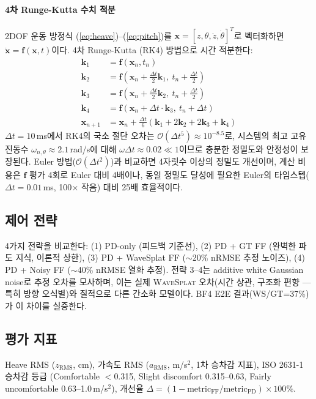 \documentclass[11pt]{report}
\numberwithin{equation}{chapter}
\numberwithin{figure}{chapter}
\numberwithin{table}{chapter}
\newcommand{\WS}{\textsc{WaveSplat}}
\begin{document}
\paragraph{4차 Runge-Kutta 수치 적분}
2DOF 운동 방정식 (\ref{eq:heave})--(\ref{eq:pitch})를
$\mathbf{x} = [z, \theta, \dot{z}, \dot{\theta}]^T$로 벡터화하면
$\dot{\mathbf{x}} = \mathbf{f}(\mathbf{x}, t)$이다.
4차 Runge-Kutta (RK4) 방법으로 시간 적분한다:
\begin{align}
  \mathbf{k}_1 &= \mathbf{f}(\mathbf{x}_n, t_n) \\
  \mathbf{k}_2 &= \mathbf{f}(\mathbf{x}_n + \tfrac{\Delta t}{2}\mathbf{k}_1,\ t_n + \tfrac{\Delta t}{2}) \\
  \mathbf{k}_3 &= \mathbf{f}(\mathbf{x}_n + \tfrac{\Delta t}{2}\mathbf{k}_2,\ t_n + \tfrac{\Delta t}{2}) \\
  \mathbf{k}_4 &= \mathbf{f}(\mathbf{x}_n + \Delta t \cdot \mathbf{k}_3,\ t_n + \Delta t) \\
  \mathbf{x}_{n+1} &= \mathbf{x}_n + \frac{\Delta t}{6}(\mathbf{k}_1 + 2\mathbf{k}_2 + 2\mathbf{k}_3 + \mathbf{k}_4)
\end{align}
$\Delta t = 10$\,ms에서 RK4의 국소 절단 오차는 $\mathcal{O}(\Delta t^5) \approx 10^{-8.5}$로,
시스템의 최고 고유진동수 $\omega_{n,\theta} \approx 2.1$\,rad/s에 대해
$\omega \Delta t \approx 0.02 \ll 1$이므로 충분한 정밀도와 안정성이 보장된다.
Euler 방법($\mathcal{O}(\Delta t^2)$)과 비교하면 4자릿수 이상의 정밀도 개선이며,
계산 비용은 $\mathbf{f}$ 평가 4회로 Euler 대비 4배이나,
동일 정밀도 달성에 필요한 Euler의 타임스텝($\Delta t = 0.01$\,ms, 100$\times$ 작음)
대비 25배 효율적이다.

\subsection{제어 전략}

4가지 전략을 비교한다:
(1) PD-only (피드백 기준선),
(2) PD + GT FF (완벽한 파도 지식, 이론적 상한),
(3) PD + WaveSplat FF ($\sim$20\% nRMSE 추정 노이즈),
(4) PD + Noisy FF ($\sim$40\% nRMSE 열화 추정).
전략 3--4는 additive white Gaussian noise로 추정 오차를 모사하며,
이는 실제 \WS{} 오차(시간 상관, 구조화 편향 --- 특히 방향 오식별)와
질적으로 다른 간소화 모델이다. BF4 E2E 결과(WS/GT=37\%)가 이 차이를 실증한다.

\subsection{평가 지표}

Heave RMS ($z_{\text{RMS}}$, cm), 가속도 RMS ($a_{\text{RMS}}$, m/s$^2$, 1차 승차감 지표),
ISO 2631-1 승차감 등급 (Comfortable $<$0.315, Slight discomfort 0.315--0.63,
Fairly uncomfortable 0.63--1.0\,m/s$^2$),
개선율 $\Delta = (1 - \text{metric}_{\text{FF}} / \text{metric}_{\text{PD}}) \times 100\%$.
\end{document}
